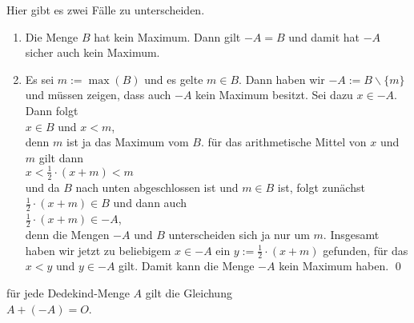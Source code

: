 \begin{enumerate}
      Hier gibt es zwei Fälle zu unterscheiden.
      \begin{enumerate}
      \item Die Menge $B$ hat kein Maximum.  Dann gilt $-A = B$ und damit hat $-A$ sicher auch kein
            Maximum. 
      \item Es sei $m := \max(B)$ und es gelte $m \in B$.  Dann haben wir $-A := B \backslash \{ m \}$
            und müssen zeigen, dass auch $-A$ kein Maximum besitzt.   Sei dazu $x \in -A$.
            Dann folgt 
            \\[0.2cm]
            \hspace*{1.3cm}
            $x \in B$ \quad und \quad $x < m$, 
            \\[0.2cm]
            denn $m$ ist ja das Maximum vom $B$.  für das arithmetische Mittel von $x$ und $m$ gilt
            dann
            \\[0.2cm]
            \hspace*{1.3cm}
            $x < \frac{1}{2} \cdot (x + m) < m$
            \\[0.2cm]
            und da $B$ nach unten abgeschlossen ist und $m \in B$ ist, folgt zunächst $\frac{1}{2} \cdot (x + m) \in
            B$ und dann auch
            \\[0.2cm]
            \hspace*{1.3cm}
            $\frac{1}{2} \cdot (x + m) \in -A$,
            \\[0.2cm]  
            denn die Mengen $-A$ und $B$ unterscheiden sich ja nur um $m$.  Insgesamt haben wir
            jetzt zu beliebigem $x \in -A$ ein $y := \frac{1}{2} \cdot (x + m)$ gefunden, für das 
            $x < y$ und $y \in -A$ gilt.  Damit kann die Menge $-A$ kein Maximum haben. \qed
      \end{enumerate}

\end{enumerate}

\begin{Satz}
  für jede Dedekind-Menge $A$ gilt die Gleichung
  \\[0.2cm]
  \hspace*{1.3cm}
  $A + (-A) = O$. \eox
\end{Satz}

